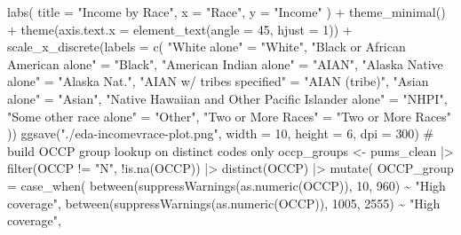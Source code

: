 \documentclass[
  letterpaper,
  DIV=11,
  numbers=noendperiod]{scrartcl}
\newenvironment{Shaded}{\begin{snugshade}}{\end{snugshade}}
\newcommand{\AttributeTok}[1]{\textcolor[rgb]{0.40,0.45,0.13}{#1}}
\newcommand{\CommentTok}[1]{\textcolor[rgb]{0.37,0.37,0.37}{#1}}
\newcommand{\DecValTok}[1]{\textcolor[rgb]{0.68,0.00,0.00}{#1}}
\newcommand{\FunctionTok}[1]{\textcolor[rgb]{0.28,0.35,0.67}{#1}}
\newcommand{\NormalTok}[1]{\textcolor[rgb]{0.00,0.23,0.31}{#1}}
\newcommand{\OtherTok}[1]{\textcolor[rgb]{0.00,0.23,0.31}{#1}}
\newcommand{\SpecialCharTok}[1]{\textcolor[rgb]{0.37,0.37,0.37}{#1}}
\newcommand{\StringTok}[1]{\textcolor[rgb]{0.13,0.47,0.30}{#1}}
\begin{document}
\begin{Shaded}
\begin{Highlighting}[]
  \FunctionTok{labs}\NormalTok{(}
    \AttributeTok{title =} \StringTok{"Income by Race"}\NormalTok{,}
    \AttributeTok{x =} \StringTok{"Race"}\NormalTok{,}
    \AttributeTok{y =} \StringTok{"Income"}
\NormalTok{  ) }\SpecialCharTok{+}
  \FunctionTok{theme\_minimal}\NormalTok{() }\SpecialCharTok{+}
  \FunctionTok{theme}\NormalTok{(}\AttributeTok{axis.text.x =} \FunctionTok{element\_text}\NormalTok{(}\AttributeTok{angle =} \DecValTok{45}\NormalTok{, }\AttributeTok{hjust =} \DecValTok{1}\NormalTok{)) }\SpecialCharTok{+}
  \FunctionTok{scale\_x\_discrete}\NormalTok{(}\AttributeTok{labels =} \FunctionTok{c}\NormalTok{(}
    \StringTok{"White alone"} \OtherTok{=} \StringTok{"White"}\NormalTok{,}
    \StringTok{"Black or African American alone"} \OtherTok{=} \StringTok{"Black"}\NormalTok{,}
    \StringTok{"American Indian alone"} \OtherTok{=} \StringTok{"AIAN"}\NormalTok{,}
    \StringTok{"Alaska Native alone"} \OtherTok{=} \StringTok{"Alaska Nat."}\NormalTok{,}
    \StringTok{"AIAN w/ tribes specified"} \OtherTok{=} \StringTok{"AIAN (tribe)"}\NormalTok{,}
    \StringTok{"Asian alone"} \OtherTok{=} \StringTok{"Asian"}\NormalTok{,}
    \StringTok{"Native Hawaiian and Other Pacific Islander alone"} \OtherTok{=} \StringTok{"NHPI"}\NormalTok{,}
    \StringTok{"Some other race alone"} \OtherTok{=} \StringTok{"Other"}\NormalTok{,}
    \StringTok{"Two or More Races"} \OtherTok{=} \StringTok{"Two or More Races"}
\NormalTok{  ))}
\FunctionTok{ggsave}\NormalTok{(}\StringTok{"./eda{-}incomevrace{-}plot.png"}\NormalTok{, }\AttributeTok{width =} \DecValTok{10}\NormalTok{, }\AttributeTok{height =} \DecValTok{6}\NormalTok{, }\AttributeTok{dpi =} \DecValTok{300}\NormalTok{)}
\CommentTok{\# build OCCP group lookup on distinct codes only}
\NormalTok{occp\_groups }\OtherTok{\textless{}{-}}\NormalTok{ pums\_clean }\SpecialCharTok{|\textgreater{}}
  \FunctionTok{filter}\NormalTok{(OCCP }\SpecialCharTok{!=} \StringTok{"N"}\NormalTok{, }\SpecialCharTok{!}\FunctionTok{is.na}\NormalTok{(OCCP)) }\SpecialCharTok{|\textgreater{}}
  \FunctionTok{distinct}\NormalTok{(OCCP) }\SpecialCharTok{|\textgreater{}}
  \FunctionTok{mutate}\NormalTok{(}
    \AttributeTok{OCCP\_group =} \FunctionTok{case\_when}\NormalTok{(}
      \FunctionTok{between}\NormalTok{(}\FunctionTok{suppressWarnings}\NormalTok{(}\FunctionTok{as.numeric}\NormalTok{(OCCP)), }\DecValTok{10}\NormalTok{,   }\DecValTok{960}\NormalTok{)  }\SpecialCharTok{\textasciitilde{}} \StringTok{"High coverage"}\NormalTok{,}
      \FunctionTok{between}\NormalTok{(}\FunctionTok{suppressWarnings}\NormalTok{(}\FunctionTok{as.numeric}\NormalTok{(OCCP)), }\DecValTok{1005}\NormalTok{, }\DecValTok{2555}\NormalTok{) }\SpecialCharTok{\textasciitilde{}} \StringTok{"High coverage"}\NormalTok{,}

\end{Highlighting}
\end{Shaded}
\end{document}
